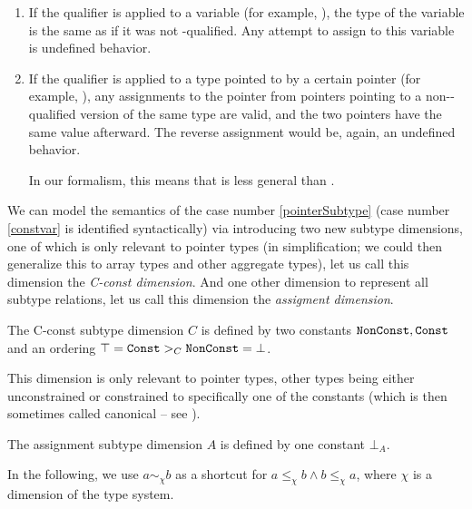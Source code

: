 \begin{enumerate}
    \item If the  qualifier is applied to a variable (for example, ), the type of the variable is the same as if it was not -qualified. Any attempt to assign to this variable is undefined behavior. \label{constvar}

    \item If the  qualifier is applied to a type pointed to by a certain pointer (for example, ), any assignments to the pointer from pointers pointing to a non--qualified version of the same type are valid, and the two pointers have the same value afterward. The reverse assignment would be, again, an undefined behavior. \label{pointerSubtype}

    In our formalism, this means that  is less general than .
\end{enumerate}

We can model the semantics of the case number \ref{pointerSubtype} (case number \ref{constvar} is identified syntactically) via introducing two new subtype dimensions, one of which is only relevant to pointer types (in simplification; we could then generalize this to array types and other aggregate types), let us call this dimension the \emph{C-const dimension}. And one other dimension to represent all subtype relations, let us call this dimension the \emph{assigment dimension}.

\begin{defn}
    The C-const subtype dimension $C$ is defined by two constants $\mathtt{NonConst}, \mathtt{Const}$ and an ordering $\top = \mathtt{Const} >_C \mathtt{NonConst} = \bot$.

    This dimension is only relevant to pointer types, other types being either unconstrained or constrained to specifically one of the constants (which is then sometimes called canonical -- see \cite{tiuryn1999subtyping}).
\end{defn}

\begin{defn}
    The assignment subtype dimension $A$ is defined by one constant $\bot_A$.
\end{defn}

In the following, we use $a \sim_\chi b$ as a shortcut for $a \leq_\chi b \land b \leq_\chi a$, where $\chi$ is a dimension of the type system.

